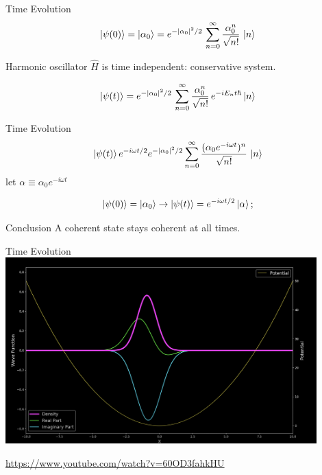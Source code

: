 \documentclass{loyola-beamer}
\begin{document}
\begin{frame}{Time Evolution}
	\begin{align*}
		\ket{\psi(0)} = \ket{\alpha_0} = e^{-|\alpha_0|^2/2}\,
		\sum_{n=0}^\infty \frac{\alpha_0^n}{\sqrt{n!}} \, \ket{n}
	\end{align*}

	\begin{block}{Harmonic oscillator}
		$\hat{H}$ is time independent: conservative system.
	\end{block}


	\begin{align*}
		\ket{\psi(t)} = e^{-|\alpha_0|^2/2}\,
		\sum_{n=0}^\infty \frac{\alpha_0^n}{\sqrt{n!}} \,  e^{-iE_nt\hbar} \ket{n}
	\end{align*}
\end{frame}

\begin{frame}{Time Evolution}
	\begin{align*}
		\ket{\psi(t)} e^{-i\omega t/2} e^{-|\alpha_0|^2 /2}
		\sum_{n=0}^\infty \frac{(\alpha_0 e^{-i\omega t})^n}{\sqrt{n!}}\, \ket{n}
	\end{align*}
	let $\alpha \equiv \alpha_0 e^{-i\omega t}$

	\begin{align*}
		\ket{\psi(0)} = \ket{\alpha_0} \rightarrow \ket{\psi(t)} = e^{-i\omega t/2} \ket{\alpha};
	\end{align*}

	\begin{block}{Conclusion}
		A coherent state stays coherent at all times.
	\end{block}
\end{frame}


\begin{frame}{Time Evolution}
	\includegraphics[width=0.9\textwidth]{anim.png}

	\href{https://www.youtube.com/watch?v=60OD3fahkHU}{https://www.youtube.com/watch?v=60OD3fahkHU}
\end{frame}
\end{document}
